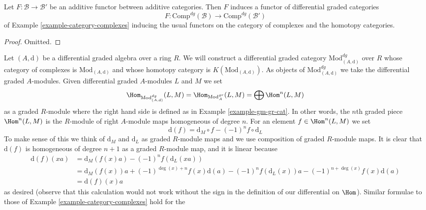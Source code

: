 \begin{lemma}
\label{lemma-additive-functor-induces-dga-functor}
Let $F : \mathcal{B} \to \mathcal{B}'$ be an additive functor between
additive categories. Then $F$ induces a functor of differential
graded categories
$$
F : \text{Comp}^{dg}(\mathcal{B}) \to \text{Comp}^{dg}(\mathcal{B}')
$$
of Example \ref{example-category-complexes}
inducing the usual functors on the category of complexes and the
homotopy categories.
\end{lemma}

\begin{proof}
Omitted.
\end{proof}

\begin{example}
\label{example-dgm-dg-cat}
Let $(A, \text{d})$ be a differential graded algebra over a ring $R$. We will
construct a differential graded category $\text{Mod}^{dg}_{(A, \text{d})}$
over $R$ whose category of complexes is $\text{Mod}_{(A, \text{d})}$ and
whose homotopy category is $K(\text{Mod}_{(A, \text{d})})$.
As objects of $\text{Mod}^{dg}_{(A, \text{d})}$
we take the differential graded $A$-modules. Given differential
graded $A$-modules $L$ and $M$ we set
$$
\Hom_{\text{Mod}^{dg}_{(A, \text{d})}}(L, M) =
\Hom_{\text{Mod}^{gr}_A}(L, M) = \bigoplus \Hom^n(L, M)
$$
as a graded $R$-module where the right hand side is defined as in
Example \ref{example-gm-gr-cat}. In other words, the $n$th graded piece
$\Hom^n(L, M)$ is the $R$-module of right $A$-module maps homogeneous
of degree $n$. For an element $f \in \Hom^n(L, M)$ we set
$$
\text{d}(f) = \text{d}_M \circ f - (-1)^n f \circ \text{d}_L
$$
To make sense of this we think of $\text{d}_M$ and $\text{d}_L$
as graded $R$-module maps and we use composition of graded
$R$-module maps. It is clear that $\text{d}(f)$ is homogeneous of
degree $n + 1$ as a graded $R$-module map, and it is linear
because
\begin{align*}
\text{d}(f)(xa)
& =
\text{d}_M(f(x) a) - (-1)^n f (\text{d}_L(xa)) \\
& =
\text{d}_M(f(x)) a + (-1)^{\deg(x) + n} f(x) \text{d}(a) 
- (-1)^n f(\text{d}_L(x)) a - (-1)^{n + \deg(x)} f(x) \text{d}(a) \\
& = \text{d}(f)(x) a
\end{align*}
as desired (observe that this calculation would not work without the
sign in the definition of our differential on $\Hom$). Similar formulae
to those of Example \ref{example-category-complexes} hold for the

\end{example}
